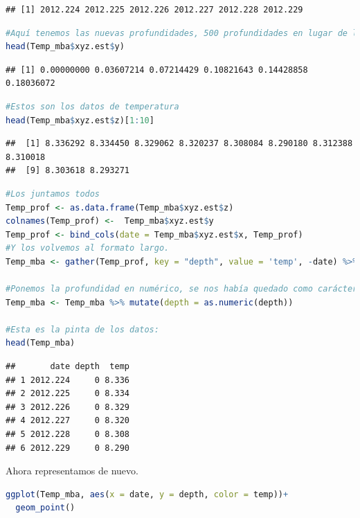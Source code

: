 \documentclass[
]{book}
\begin{document}
\begin{lstlisting}
## [1] 2012.224 2012.225 2012.226 2012.227 2012.228 2012.229
\end{lstlisting}

\begin{lstlisting}[language=R]
#Aquí tenemos las nuevas profundidades, 500 profundidades en lugar de las 19 que teniamos antes
head(Temp_mba$xyz.est$y)
\end{lstlisting}

\begin{lstlisting}
## [1] 0.00000000 0.03607214 0.07214429 0.10821643 0.14428858 0.18036072
\end{lstlisting}

\begin{lstlisting}[language=R]
#Estos son los datos de temperatura
head(Temp_mba$xyz.est$z)[1:10]
\end{lstlisting}

\begin{lstlisting}
##  [1] 8.336292 8.334450 8.329062 8.320237 8.308084 8.290180 8.312388 8.310018
##  [9] 8.303618 8.293271
\end{lstlisting}

\begin{lstlisting}[language=R]
#Los juntamos todos
Temp_prof <- as.data.frame(Temp_mba$xyz.est$z)
colnames(Temp_prof) <-  Temp_mba$xyz.est$y
Temp_prof <- bind_cols(date = Temp_mba$xyz.est$x, Temp_prof)
#Y los volvemos al formato largo.
Temp_mba <- gather(Temp_prof, key = "depth", value = 'temp', -date) %>%  mutate(temp = round(temp, 3))

#Ponemos la profundidad en numérico, se nos había quedado como carácter
Temp_mba <- Temp_mba %>% mutate(depth = as.numeric(depth))

#Esta es la pinta de los datos:
head(Temp_mba)
\end{lstlisting}

\begin{lstlisting}
##       date depth  temp
## 1 2012.224     0 8.336
## 2 2012.225     0 8.334
## 3 2012.226     0 8.329
## 4 2012.227     0 8.320
## 5 2012.228     0 8.308
## 6 2012.229     0 8.290
\end{lstlisting}

Ahora representamos de nuevo.

\begin{lstlisting}[language=R]
ggplot(Temp_mba, aes(x = date, y = depth, color = temp))+
  geom_point()
\end{lstlisting}
\end{document}
